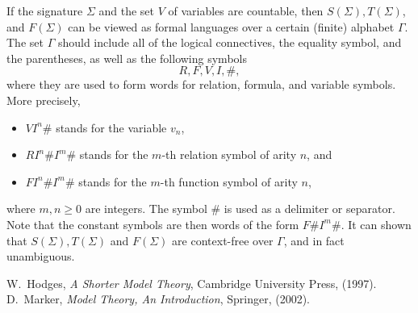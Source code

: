 \documentclass[12pt]{article}
\begin{document}
If the signature $\Sigma$ and the set $V$ of variables are countable, then $S(\Sigma), T(\Sigma)$, and $F(\Sigma)$ can be viewed as formal languages over a certain (finite) alphabet $\Gamma$.  The set $\Gamma$ should include all of the logical connectives, the equality symbol, and the parentheses, as well as the following symbols $$R,F,V,I,\#,$$ where they are used to form words for relation, formula, and variable symbols.  More precisely, 
\begin{itemize}
\item $VI^n\#$ stands for the variable $v_n$,
\item $RI^n\#I^m\#$ stands for the $m$-th relation symbol of arity $n$, and
\item $FI^n\#I^m\#$ stands for the $m$-th function symbol of arity $n$,
\end{itemize}
where $m,n\ge 0$ are integers.  The symbol $\#$ is used as a delimiter or separator.  Note that the constant symbols are then words of the form $F\#I^m\#$.  It can shown that $S(\Sigma), T(\Sigma)$ and $F(\Sigma)$ are context-free over $\Gamma$, and in fact unambiguous.

\begin{thebibliography}{99}
W.~Hodges, {\it A Shorter Model Theory}, Cambridge University Press, (1997).
D.~Marker, {\it Model Theory, An Introduction}, Springer, (2002).
\end{thebibliography}
\end{document}
